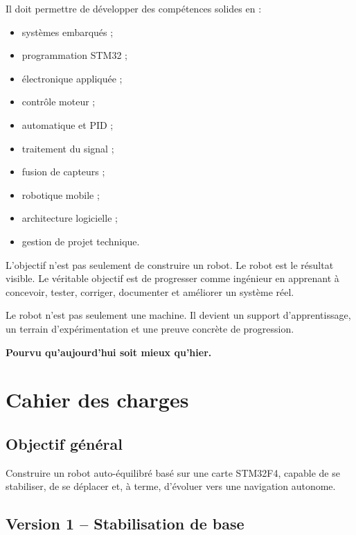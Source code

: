 \documentclass[11pt,a4paper]{article}
\begin{document}
	Il doit permettre de développer des compétences solides en :
	
	\begin{itemize}
		\item systèmes embarqués ;
		\item programmation STM32 ;
		\item électronique appliquée ;
		\item contrôle moteur ;
		\item automatique et PID ;
		\item traitement du signal ;
		\item fusion de capteurs ;
		\item robotique mobile ;
		\item architecture logicielle ;
		\item gestion de projet technique.
	\end{itemize}
	
	L'objectif n'est pas seulement de construire un robot. Le robot est le résultat visible. Le véritable objectif est de progresser comme ingénieur en apprenant à concevoir, tester, corriger, documenter et améliorer un système réel.
	
	\begin{motivation}
		Le robot n'est pas seulement une machine. Il devient un support d'apprentissage, un terrain d'expérimentation et une preuve concrète de progression.
		
		\centering
		\textbf{Pourvu qu'aujourd'hui soit mieux qu'hier.}
	\end{motivation}
	
	\section{Cahier des charges}
	
	\subsection*{Objectif général}
	
	Construire un robot auto-équilibré basé sur une carte STM32F4, capable de se stabiliser, de se déplacer et, à terme, d'évoluer vers une navigation autonome.
	
	\subsection*{Version 1 -- Stabilisation de base}
	
\end{document}
